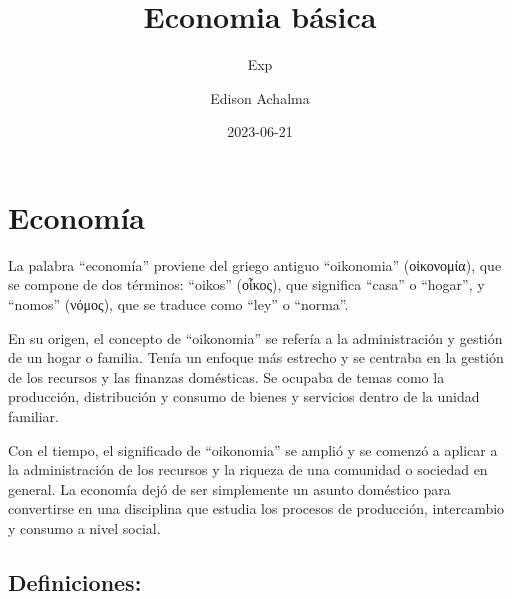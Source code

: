 \documentclass[
  letterpaper,
  DIV=11,
  numbers=noendperiod]{scrartcl}
\title{Economia básica}
\subtitle{Exp}
\author{Edison Achalma}
\date{2023-06-21}
\begin{document}
\maketitle
\ifdefined\Shaded\renewenvironment{Shaded}{\begin{tcolorbox}[frame hidden, sharp corners, boxrule=0pt, interior hidden, borderline west={3pt}{0pt}{shadecolor}, enhanced, breakable]}{\end{tcolorbox}}\fi

\hypertarget{economuxeda}{%
\section{Economía}\label{economuxeda}}

La palabra ``economía'' proviene del griego antiguo ``oikonomia''
(οἰκονομία), que se compone de dos términos: ``oikos'' (οἶκος), que
significa ``casa'' o ``hogar'', y ``nomos'' (νόμος), que se traduce como
``ley'' o ``norma''.

En su origen, el concepto de ``oikonomia'' se refería a la
administración y gestión de un hogar o familia. Tenía un enfoque más
estrecho y se centraba en la gestión de los recursos y las finanzas
domésticas. Se ocupaba de temas como la producción, distribución y
consumo de bienes y servicios dentro de la unidad familiar.

Con el tiempo, el significado de ``oikonomia'' se amplió y se comenzó a
aplicar a la administración de los recursos y la riqueza de una
comunidad o sociedad en general. La economía dejó de ser simplemente un
asunto doméstico para convertirse en una disciplina que estudia los
procesos de producción, intercambio y consumo a nivel social.

\hypertarget{definiciones}{%
\subsection{Definiciones:}\label{definiciones}}
\end{document}
